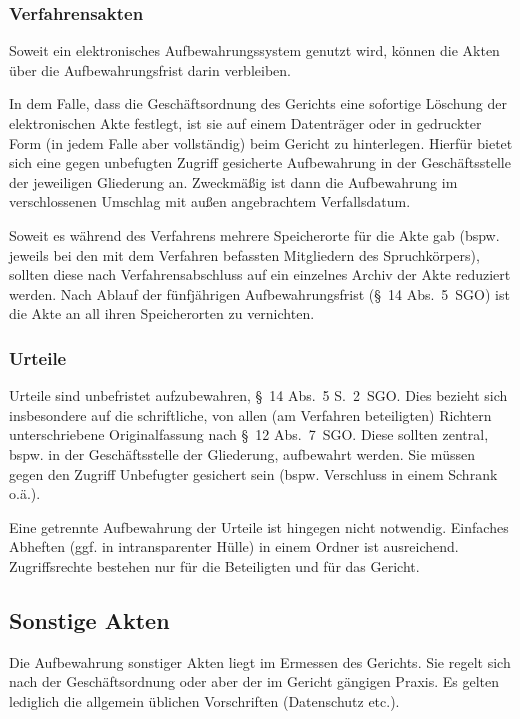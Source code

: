 \subsubsection{Verfahrensakten}
Soweit ein elektronisches Aufbewahrungssystem genutzt wird, können die Akten über die Aufbewahrungsfrist darin verbleiben.

In dem Falle, dass die Geschäftsordnung des Gerichts eine sofortige Löschung der elektronischen Akte festlegt, ist sie auf einem Datenträger oder in gedruckter Form (in jedem Falle aber vollständig) beim Gericht zu hinterlegen.
Hierfür bietet sich eine gegen unbefugten Zugriff gesicherte Aufbewahrung in der Geschäftsstelle der jeweiligen Gliederung an.
Zweckmäßig ist dann die Aufbewahrung im verschlossenen Umschlag mit außen angebrachtem Verfallsdatum.

Soweit es während des Verfahrens mehrere Speicherorte für die Akte gab (bspw. jeweils bei den mit dem Verfahren befassten Mitgliedern des Spruchkörpers), sollten diese nach Verfahrensabschluss auf ein einzelnes Archiv der Akte reduziert werden.
Nach Ablauf der fünfjährigen Aufbewahrungsfrist (\S~14 Abs.~5~SGO) ist die Akte an all ihren Speicherorten zu vernichten.

\subsubsection{Urteile}
Urteile sind unbefristet aufzubewahren, \S~14 Abs.~5 S.~2~SGO.
Dies bezieht sich insbesondere auf die schriftliche, von allen (am Verfahren beteiligten) Richtern unterschriebene Originalfassung nach \S~12 Abs.~7~SGO.
Diese sollten zentral, bspw. in der Geschäftsstelle der Gliederung, aufbewahrt werden.
Sie müssen gegen den Zugriff Unbefugter gesichert sein (bspw. Verschluss in einem Schrank o.ä.).

Eine getrennte Aufbewahrung der Urteile ist hingegen nicht notwendig.
Einfaches Abheften (ggf. in intransparenter Hülle) in einem Ordner ist ausreichend.
Zugriffsrechte bestehen nur für die Beteiligten und für das Gericht.

\subsection{Sonstige Akten}
Die Aufbewahrung sonstiger Akten liegt im Ermessen des Gerichts.
Sie regelt sich nach der Geschäftsordnung oder aber der im Gericht gängigen Praxis.
Es gelten lediglich die allgemein üblichen Vorschriften (Datenschutz etc.).

